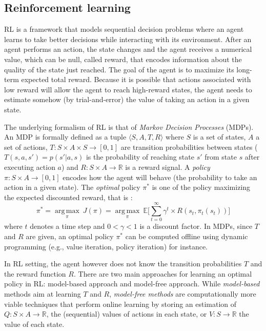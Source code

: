 \subsection{Reinforcement learning}

RL is a framework that models sequential decision
problems where an agent learns to take better decisions while interacting with
its environment. After an agent performs an action, the state changes and the
agent receives a numerical value, which can be null, called reward, that encodes information
about the quality of the state just reached. The goal of the agent is to maximize
its long-term expected total reward. Because it is possible that actions associated 
with low reward will allow the agent to reach high-reward states, the agent
needs to estimate somehow (by trial-and-error) the value of taking an action in
a given state.

The underlying formalism of RL is that of {\em Markov Decision Processes} (MDPs).
An MDP is formally defined as a tuple $\langle S, A, T, R \rangle$ where $S$ is a set of states, $A$ a set of actions, $T : S \times A \times S \rightarrow [0, 1]$ 
are transition probabilities between states
($T(s,a,s')=p(s'|a,s)$ is the probability of reaching state $s'$ from state $s$ after executing action $a$) and 
$R : S \times A \rightarrow \mathbb{R}$ is a reward signal. A \textit{policy} $\pi : S \times A \rightarrow [0, 1]$ encodes how the agent will behave (the probability
to take an action in a given state).
The {\em optimal} policy $\pi^*$ is one of the policy maximizing the expected discounted reward, that is :
\begin{equation}
\pi^* = \underset{\pi}{\operatorname{arg\,max}}\ J(\pi) = \underset{\pi}{\operatorname{arg\,max}}\ \mathbb{E} \Big[ \sum\limits_{t=0}^{\infty} \gamma^t \times R(s_t, \pi_t(s_t)) \Big]
\end{equation}
where $t$ denotes a time step and $0 < \gamma < 1$ is a discount factor.
In MDPs, since $T$ and $R$ are given, an optimal policy $\pi^*$ can be computed offline using dynamic programming (e.g., value iteration, policy                                                                  
iteration) \cite{Howard1960} for instance.

In RL setting, the agent however does not know the transition probabilities $T$ and the reward function $R$.
There are two main approaches for learning an optimal policy in RL: model-based approach and model-free approach.
While {\em model-based} methods aim at learning $T$ and $R$,
{\em model-free methods} are computationally more viable techniques
that perform online learning by storing an estimation of $Q : S \times A \rightarrow \mathbb{R}$, the (sequential) values of actions in each state,
or $V : S \rightarrow \mathbb{R}$ the value of each state.

